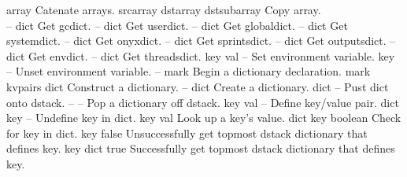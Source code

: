 \begin{longtable}{}
	{array}
	{Catenate arrays.}
\hline
\optableent
	{srcarray dstarray}
	{{\bf {}}}
	{dstsubarray}
	{Copy array.}
\hline \hline
{} \\
\hline \hline
\optableent
	{--}
	{{\bf {}}}
	{dict}
	{Get gcdict.}
\hline
\optableent
	{--}
	{{\bf {}}}
	{dict}
	{Get userdict.}
\hline
\optableent
	{--}
	{{\bf {}}}
	{dict}
	{Get globaldict.}
\hline
\optableent
	{--}
	{{\bf {}}}
	{dict}
	{Get systemdict.}
\hline
\optableent
	{--}
	{{\bf {}}}
	{dict}
	{Get onyxdict.}
\hline
\optableent
	{--}
	{{\bf {}}}
	{dict}
	{Get sprintsdict.}
\hline
\optableent
	{--}
	{{\bf {}}}
	{dict}
	{Get outputsdict.}
\hline
\optableent
	{--}
	{{\bf {}}}
	{dict}
	{Get envdict.}
\hline
\optableent
	{--}
	{{\bf {}}}
	{dict}
	{Get threadsdict.}
\hline
\optableent
	{key val}
	{{\bf {}}}
	{--}
	{Set environment variable.}
\hline
\optableent
	{key}
	{{\bf {}}}
	{--}
	{Unset environment variable.}
\hline
\optableent
	{--}
	{{\bf {}}}
	{mark}
	{Begin a dictionary declaration.}
\hline
\optableent
	{mark kvpairs}
	{{\bf {}}}
	{dict}
	{Construct a dictionary.}
\hline
\optableent
	{--}
	{{\bf {}}}
	{dict}
	{Create a dictionary.}
\hline
\optableent
	{dict}
	{{\bf {}}}
	{--}
	{Pust dict onto dstack.}
\hline
\optableent
	{--}
	{{\bf {}}}
	{--}
	{Pop a dictionary off dstack.}
\hline
\optableent
	{key val}
	{{\bf {}}}
	{--}
	{Define key/value pair.}
\hline
\optableent
	{dict key}
	{{\bf {}}}
	{--}
	{Undefine key in dict.}
\hline
\optableent
	{key}
	{{\bf {}}}
	{val}
	{Look up a key's value.}
\hline
\optableent
	{dict key}
	{{\bf {}}}
	{boolean}
	{Check for key in dict.}
\hline
\optableent
	{key}
	{{\bf {}}}
	{false}
	{Unsuccessfully get topmost dstack dictionary that defines key.}
\hline
\optableent
	{key}
	{{\bf {}}}
	{dict true}
	{Successfully get topmost dstack dictionary that defines key.}

\end{longtable}
